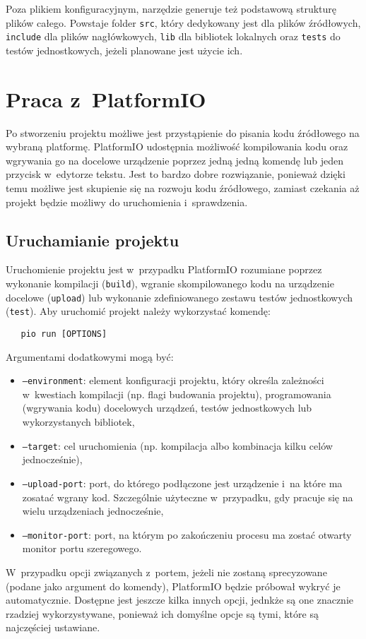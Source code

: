 Poza plikiem konfiguracyjnym, narzędzie generuje też podstawową strukturę plików całego. Powstaje folder \texttt{src},
który dedykowany jest dla plików źródłowych, \texttt{include} dla plików nagłówkowych, \texttt{lib} dla bibliotek
lokalnych oraz \texttt{tests} do testów jednostkowych, jeżeli planowane jest użycie ich.

\section{Praca z~PlatformIO\label{sect:pio-work}} Po stworzeniu projektu możliwe jest przystąpienie do pisania kodu
źródłowego na wybraną platformę. PlatformIO udostępnia możliwość kompilowania kodu oraz wgrywania go na docelowe
urządzenie poprzez jedną jedną komendę lub jeden przycisk w~edytorze tekstu. Jest to bardzo dobre rozwiązanie,
ponieważ dzięki temu możliwe jest skupienie się na rozwoju kodu źródłowego, zamiast czekania aż projekt będzie możliwy
do uruchomienia i~sprawdzenia.

\subsection{Uruchamianie projektu\label{sect:pio-run}} Uruchomienie projektu jest w~przypadku PlatformIO rozumiane
poprzez wykonanie kompilacji (\texttt{build}), wgranie skompilowanego kodu na urządzenie docelowe (\texttt{upload}) lub
wykonanie zdefiniowanego zestawu testów jednostkowych (\texttt{test}). Aby uruchomić projekt należy wykorzystać komendę:
\begin{verbatim}
   pio run [OPTIONS]
\end{verbatim}
Argumentami dodatkowymi mogą być:
\begin{itemize}[label=]
    \item \texttt{--environment}: element konfiguracji projektu, który określa zależności w~kwestiach
          kompilacji (np. flagi budowania projektu), programowania (wgrywania kodu) docelowych urządzeń, testów
          jednostkowych lub wykorzystanych bibliotek,
    \item \texttt{--target}: cel uruchomienia (np. kompilacja albo kombinacja kilku celów jednocześnie),
    \item \texttt{--upload-port}: port, do którego podłączone jest urządzenie i~na które ma zosatać wgrany kod.
          Szczególnie użyteczne w~przypadku, gdy pracuje się na wielu urządzeniach jednocześnie,
    \item \texttt{--monitor-port}: port, na którym po zakończeniu procesu ma zostać otwarty monitor portu szeregowego.
\end{itemize}
W~przypadku opcji związanych z~portem, jeżeli nie zostaną sprecyzowane (podane jako argument do komendy), PlatformIO
będzie próbował wykryć je automatycznie. Dostępne jest jeszcze kilka innych opcji, jednkże są one znacznie rzadziej
wykorzystywane, ponieważ ich domyślne opcje są tymi, które są najczęściej ustawiane.

